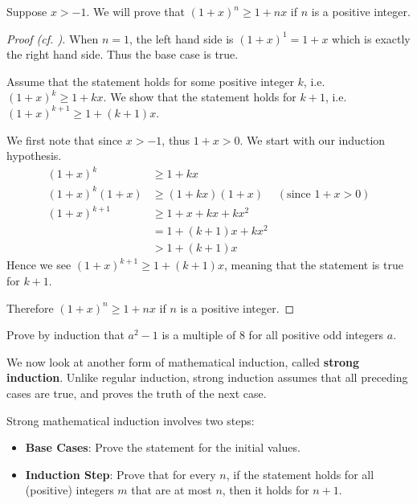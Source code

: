 \begin{example}
    Suppose $x > -1$. We will prove that $(1+x)^n \geq 1+nx$ if $n$ is a positive integer.
    \begin{proof}[Proof (cf. {\cite[p.~186]{hammack_2018}})]
        When $n = 1$, the left hand side is $(1+x)^1 = 1+x$ which is exactly the right hand side. Thus the base case is true.
        
        Assume that the statement holds for some positive integer $k$, i.e. $(1+x)^k \geq 1+kx$. We show that the statement holds for $k+1$, i.e. $(1+x)^{k+1} \geq 1+(k+1)x$.
        
        We first note that since $x>-1$, thus $1+x > 0$. We start with our induction hypothesis.
        \begin{align*}
            (1+x)^k &\geq 1+kx\\
            (1+x)^k(1+x) &\geq (1+kx)(1+x) & (\text{since }1+x > 0)\\
            (1+x)^{k+1} &\geq 1 + x + kx + kx^2\\
            &= 1+(k+1)x + kx^2\\
            &> 1+(k+1)x
        \end{align*}
        Hence we see $(1+x)^{k+1} \geq 1+(k+1)x$, meaning that the statement is true for $k+1$.
        
        Therefore $(1+x)^n \geq 1+nx$ if $n$ is a positive integer.
    \end{proof}
\end{example}

\begin{exercise}
    Prove by induction that $a^2 - 1$ is a multiple of 8 for all positive odd integers $a$.
\end{exercise}

We now look at another form of mathematical induction, called \textbf{strong induction}. Unlike regular induction, strong induction assumes that all preceding cases are true, and proves the truth of the next case.

Strong mathematical induction involves two steps:
\begin{itemize}
    \item \textbf{Base Cases}: Prove the statement for the initial values.
    \item \textbf{Induction Step}: Prove that for every $n$, if the statement holds for all (positive) integers $m$ that are at most $n$, then it holds for $n + 1$.
\end{itemize}

